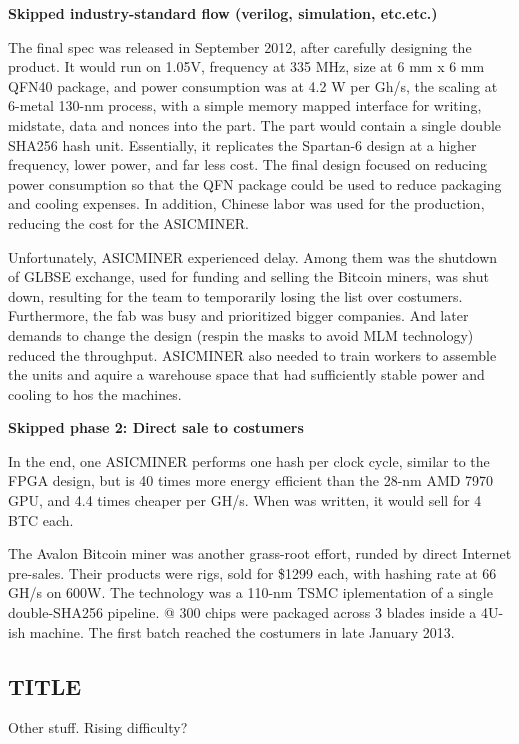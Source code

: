 \textbf{Skipped industry-standard flow (verilog, simulation, etc.etc.)}

The final spec was released in September 2012, after carefully designing the product.
It would run on 1.05V, frequency at 335 MHz, size at 6 mm x 6 mm QFN40 package, and power consumption was at 4.2 W per Gh/s, the scaling at 6-metal 130-nm process, with a simple memory mapped interface for writing, midstate, data and nonces into the part. 
The part would contain a single double SHA256 hash unit.
Essentially, it replicates the Spartan-6 design at a higher frequency, lower power, and far less cost.
The final design focused on reducing power consumption so that the QFN package could be used to reduce packaging and cooling expenses.
In addition, Chinese labor was used for the production, reducing the cost for the ASICMINER.

Unfortunately, ASICMINER experienced delay.
Among them was the shutdown of GLBSE exchange, used for funding and selling the Bitcoin miners, was shut down, resulting for the team to temporarily losing the list over costumers.
Furthermore, the fab was busy and prioritized bigger companies.
And later demands to change the design (respin the masks to avoid MLM technology) reduced the throughput.
ASICMINER also needed to train workers to assemble the units and aquire a warehouse space that had sufficiently stable power and cooling to hos the machines.

\textbf{Skipped phase 2: Direct sale to costumers}

In the end, one ASICMINER performs one hash per clock cycle, similar to the FPGA design, but is 40 times more energy efficient than the 28-nm AMD 7970 GPU, and 4.4 times cheaper per GH/s.
When \cite{bespoke-silicon} was written, it would sell for 4 BTC each.

The Avalon Bitcoin miner was another grass-root effort, runded by direct Internet pre-sales.
Their products were rigs, sold for \$1299 each, with hashing rate at 66 GH/s on 600W.
The technology was a 110-nm TSMC iplementation of a single double-SHA256 pipeline. @
300 chips were packaged across 3 blades inside a 4U-ish machine.
The first batch reached the costumers in late January 2013.

\cite{bespoke-silicon}

\subsection{TITLE}
Other stuff.
Rising difficulty?

